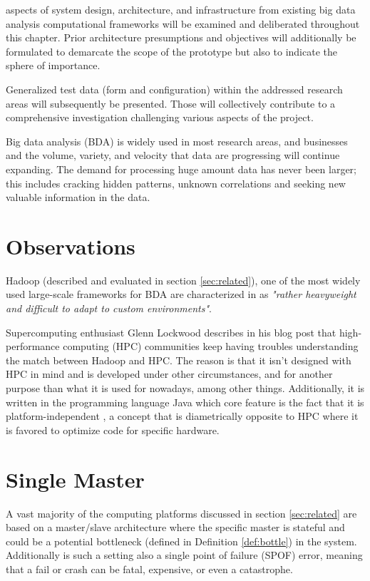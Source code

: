  aspects of system design, architecture, and infrastructure from existing big data analysis computational frameworks will be examined and deliberated throughout this chapter. Prior architecture presumptions and objectives will additionally be formulated to demarcate the scope of the prototype but also to indicate the sphere of importance. 

Generalized test data (form and configuration) within the addressed research areas will subsequently be presented. Those will collectively contribute to a comprehensive investigation challenging various aspects of the project.
\newline

Big data analysis (BDA) is widely used in most research areas, and businesses and the volume, variety, and velocity that data are progressing will continue expanding. The demand for processing huge amount data has never been larger; this includes \eg cracking hidden patterns, unknown correlations and seeking new valuable information in the data.

\section{Observations}
Hadoop (described and evaluated in section \ref{sec:related}), one of the most widely used large-scale frameworks for BDA are characterized in \cite{Mundkur:2011:DCP:2034654.2034670} as \textit{"rather heavyweight and difficult to adapt to custom environments"}. 

Supercomputing enthusiast Glenn Lockwood describes in his blog post \cite{PageLockwoodHadoop} that high-performance computing (HPC) communities keep having troubles understanding the match between Hadoop and HPC. The reason is that it isn't designed with HPC in mind and is developed under other circumstances, and for another purpose than what it is used for nowadays, among other things. Additionally, it is written in the programming language Java which core feature is the fact that it is platform-independent \cite{PageJava}, \ie a concept that is diametrically opposite to HPC where it is favored to optimize code for specific hardware.

\section{Single Master}
A vast majority of the computing platforms discussed in section \ref{sec:related} are based on a master/slave architecture where the specific master is stateful and could be a potential bottleneck (defined in Definition \ref{def:bottle}) in the system. Additionally is such a setting also a single point of failure (SPOF) error, meaning that a fail or crash can be fatal, expensive, or even a catastrophe.
\newline

